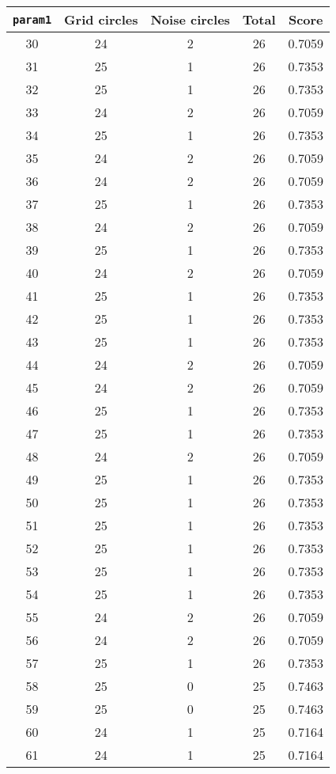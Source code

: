 \documentclass[letterpaper, 12pt]{article}
\begin{document}
\begin{longtable}{|c|c|c|c|c|}
\hline
\textbf{\texttt{param1}} & \textbf{Grid circles} & \textbf{Noise circles} & \textbf{Total} & \textbf{Score} \\
\hline
30 & 24 & 2 & 26 & 0.7059 \\
\hline
31 & 25 & 1 & 26 & 0.7353 \\
\hline
32 & 25 & 1 & 26 & 0.7353 \\
\hline
33 & 24 & 2 & 26 & 0.7059 \\
\hline
34 & 25 & 1 & 26 & 0.7353 \\
\hline
35 & 24 & 2 & 26 & 0.7059 \\
\hline
36 & 24 & 2 & 26 & 0.7059 \\
\hline
37 & 25 & 1 & 26 & 0.7353 \\
\hline
38 & 24 & 2 & 26 & 0.7059 \\
\hline
39 & 25 & 1 & 26 & 0.7353 \\
\hline
40 & 24 & 2 & 26 & 0.7059 \\
\hline
41 & 25 & 1 & 26 & 0.7353 \\
\hline
42 & 25 & 1 & 26 & 0.7353 \\
\hline
43 & 25 & 1 & 26 & 0.7353 \\
\hline
44 & 24 & 2 & 26 & 0.7059 \\
\hline
45 & 24 & 2 & 26 & 0.7059 \\
\hline
46 & 25 & 1 & 26 & 0.7353 \\
\hline
47 & 25 & 1 & 26 & 0.7353 \\
\hline
48 & 24 & 2 & 26 & 0.7059 \\
\hline
49 & 25 & 1 & 26 & 0.7353 \\
\hline
50 & 25 & 1 & 26 & 0.7353 \\
\hline
51 & 25 & 1 & 26 & 0.7353 \\
\hline
52 & 25 & 1 & 26 & 0.7353 \\
\hline
53 & 25 & 1 & 26 & 0.7353 \\
\hline
54 & 25 & 1 & 26 & 0.7353 \\
\hline
55 & 24 & 2 & 26 & 0.7059 \\
\hline
56 & 24 & 2 & 26 & 0.7059 \\
\hline
57 & 25 & 1 & 26 & 0.7353 \\
\hline
58 & 25 & 0 & 25 & 0.7463 \\
\hline
59 & 25 & 0 & 25 & 0.7463 \\
\hline
60 & 24 & 1 & 25 & 0.7164 \\
\hline
61 & 24 & 1 & 25 & 0.7164 \\

\end{longtable}
\end{document}
